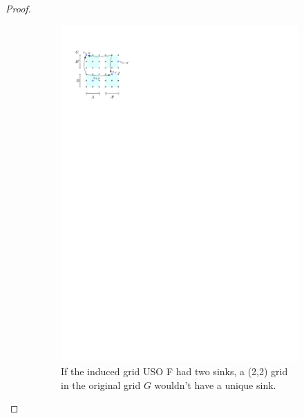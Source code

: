 \documentclass[runningheads,a4paper]{llncs}
\begin{document}
\begin{proof}
\begin{figure}
\begin{subfigure}[t]{0.47\textwidth}
\includegraphics{product_lemma_two_sinks.pdf}
\caption{\small If the induced grid USO F had two sinks, a (2,2) grid in the original grid $G$ wouldn't have a unique sink.}
\label{fig:InducedUSOtwosinks}
\end{subfigure}
\qquad\qquad
\begin{subfigure}[t]{0.47\textwidth}

\end{subfigure}
\end{figure}
\end{proof}
\end{document}
